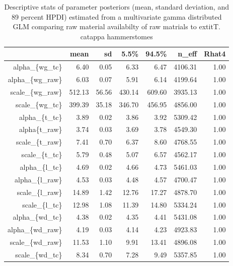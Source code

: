 \begin{table}[ht]
\centering
\begin{tabular}{rrrrrrr}
  \hline
 & mean & sd & 5.5\% & 94.5\% & n\_eff & Rhat4 \\ 
  \hline
alpha\_\{wg\_tc\} & 6.40 & 0.05 & 6.33 & 6.47 & 4106.31 & 1.00 \\ 
  alpha\_\{wg\_raw\} & 6.03 & 0.07 & 5.91 & 6.14 & 4199.64 & 1.00 \\ 
  scale\_\{wg\_raw\} & 512.13 & 56.56 & 430.14 & 609.60 & 3935.13 & 1.00 \\ 
  scale\_\{wg\_tc\} & 399.39 & 35.18 & 346.70 & 456.95 & 4856.00 & 1.00 \\ 
  alpha\_\{t\_tc\} & 3.89 & 0.02 & 3.86 & 3.92 & 5309.42 & 1.00 \\ 
  alpha\{t\_raw\} & 3.74 & 0.03 & 3.69 & 3.78 & 4549.30 & 1.00 \\ 
  scale\_\{t\_raw\} & 7.41 & 0.70 & 6.37 & 8.60 & 4768.55 & 1.00 \\ 
  scale\_\{t\_tc\} & 5.79 & 0.48 & 5.07 & 6.57 & 4562.17 & 1.00 \\ 
  alpha\_\{l\_tc\} & 4.69 & 0.02 & 4.66 & 4.73 & 5461.03 & 1.00 \\ 
  alpha\_\{l\_raw\} & 4.53 & 0.03 & 4.48 & 4.57 & 4700.47 & 1.00 \\ 
  scale\_\{l\_raw\} & 14.89 & 1.42 & 12.76 & 17.27 & 4878.70 & 1.00 \\ 
  scale\_\{l\_tc\} & 12.98 & 1.08 & 11.39 & 14.80 & 5334.24 & 1.00 \\ 
  alpha\_\{wd\_tc\} & 4.38 & 0.02 & 4.35 & 4.41 & 5431.08 & 1.00 \\ 
  alpha\_\{wd\_raw\} & 4.19 & 0.03 & 4.14 & 4.23 & 4923.83 & 1.00 \\ 
  scale\_\{wd\_raw\} & 11.53 & 1.10 & 9.91 & 13.41 & 4896.08 & 1.00 \\ 
  scale\_\{wd\_tc\} & 8.34 & 0.70 & 7.28 & 9.49 & 5357.85 & 1.00 \\ 
   \hline
\end{tabular}
\caption{Descriptive stats of parameter posteriors 
               (mean, standard deviation, and 89 percent HPDI) estimated from a multivariate 
               gamma distributed GLM comparing raw material availabilty of raw matrials 
               to 	extit{T. catappa} hammerstomes} 
\label{tab:model_sum_raw_dims}
\end{table}
